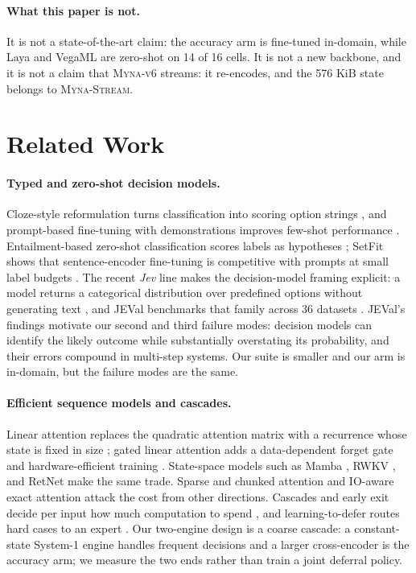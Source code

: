\documentclass[11pt]{article}
\newcommand{\stream}{\textsc{Myna-Stream}}
\newcommand{\vsix}{\textsc{Myna-v6}}
\begin{document}
\paragraph{What this paper is not.} It is not a state-of-the-art claim: the accuracy arm is fine-tuned in-domain, while Laya and VegaML are zero-shot on 14 of 16 cells. It is not a new backbone, and it is not a claim that \vsix{} streams: it re-encodes, and the 576 KiB state belongs to \stream{}.

\section{Related Work}
\label{sec:related}

\paragraph{Typed and zero-shot decision models.}
Cloze-style reformulation turns classification into scoring option strings \citep{schick2021pet}, and prompt-based fine-tuning with demonstrations improves few-shot performance \citep{gao2021lmbff}. Entailment-based zero-shot classification scores labels as hypotheses \citep{yin2019benchmarking}; SetFit shows that sentence-encoder fine-tuning is competitive with prompts at small label budgets \citep{tunstall2022setfit}. The recent \emph{Jev} line makes the decision-model framing explicit: a model returns a categorical distribution over predefined options without generating text \citep{li2026jev}, and JEVal benchmarks that family across 36 datasets \citep{duan2026gdm}. JEVal's findings motivate our second and third failure modes: decision models can identify the likely outcome while substantially overstating its probability, and their errors compound in multi-step systems. Our suite is smaller and our arm is in-domain, but the failure modes are the same.

\paragraph{Efficient sequence models and cascades.}
Linear attention replaces the quadratic attention matrix with a recurrence whose state is fixed in size \citep{katharopoulos2020transformers}; gated linear attention adds a data-dependent forget gate and hardware-efficient training \citep{yang2024gla}. State-space models such as Mamba \citep{gu2024mamba}, RWKV \citep{peng2023rwkv}, and RetNet \citep{sun2023retnet} make the same trade. Sparse and chunked attention \citep{beltagy2020longformer,zaheer2020bigbird,dai2019transformerxl} and IO-aware exact attention \citep{dao2022flashattention} attack the cost from other directions. Cascades and early exit decide per input how much computation to spend \citep{viola2001rapid,teerapittayanon2016branchynet,xin2020fastbert,zhou2020deebert}, and learning-to-defer routes hard cases to an expert \citep{madras2018predict}. Our two-engine design is a coarse cascade: a constant-state System-1 engine handles frequent decisions and a larger cross-encoder is the accuracy arm; we measure the two ends rather than train a joint deferral policy.
\end{document}

